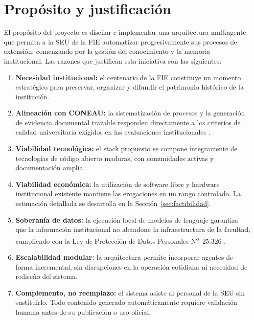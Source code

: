 \documentclass[a4paper, 12pt]{article}
\begin{document}
\section{Prop\'osito y justificaci\'on}

El prop\'osito del proyecto es dise\~nar e implementar una arquitectura multiagente que permita a la \ac{SEU} de la \ac{FIE} automatizar progresivamente sus procesos de extensi\'on, comenzando por la gesti\'on del conocimiento y la memoria institucional. Las razones que justifican esta iniciativa son las siguientes:

\begin{enumerate}[label=\arabic*.]
  \item \textbf{Necesidad institucional:} el centenario de la \ac{FIE} constituye un momento estrat\'egico para preservar, organizar y difundir el patrimonio hist\'orico de la instituci\'on.

  \item \textbf{Alineaci\'on con \ac{CONEAU}:} la sistematizaci\'on de procesos y la generaci\'on de evidencia documental trazable responden directamente a los criterios de calidad universitaria exigidos en las evaluaciones institucionales \parencite{coneau2020}.

  \item \textbf{Viabilidad tecnol\'ogica:} el stack propuesto se compone \'integramente de tecnolog\'ias de c\'odigo abierto maduras, con comunidades activas y documentaci\'on amplia.

  \item \textbf{Viabilidad econ\'omica:} la utilizaci\'on de software libre y hardware institucional existente mantiene las erogaciones en un rango controlado. La estimaci\'on detallada se desarrolla en la Secci\'on~\ref{sec:factibilidad}.

  \item \textbf{Soberan\'ia de datos:} la ejecuci\'on local de modelos de lenguaje garantiza que la informaci\'on institucional no abandone la infraestructura de la facultad, cumpliendo con la Ley de Protecci\'on de Datos Personales N\textsuperscript{o}~25.326 \parencite{ley25326}.

  \item \textbf{Escalabilidad modular:} la arquitectura permite incorporar agentes de forma incremental, sin disrupciones en la operaci\'on cotidiana ni necesidad de redise\~no del sistema.

  \item \textbf{Complemento, no reemplazo:} el sistema asiste al personal de la \ac{SEU} sin sustituirlo. Todo contenido generado autom\'aticamente requiere validaci\'on humana antes de su publicaci\'on o uso oficial.
\end{enumerate}
\end{document}
